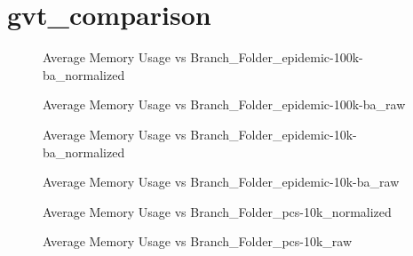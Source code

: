 \section{gvt\_comparison}
\begin{figure}[H]
\centering

\caption{Average Memory Usage vs Branch\_Folder\_epidemic-100k-ba\_normalized}
\end{figure}
\vspace{1cm}
\begin{figure}[H]
\centering

\caption{Average Memory Usage vs Branch\_Folder\_epidemic-100k-ba\_raw}
\end{figure}
\vspace{1cm}
\newpage
\begin{figure}[H]
\centering

\caption{Average Memory Usage vs Branch\_Folder\_epidemic-10k-ba\_normalized}
\end{figure}
\vspace{1cm}
\begin{figure}[H]
\centering

\caption{Average Memory Usage vs Branch\_Folder\_epidemic-10k-ba\_raw}
\end{figure}
\vspace{1cm}
\newpage
\begin{figure}[H]
\centering

\caption{Average Memory Usage vs Branch\_Folder\_pcs-10k\_normalized}
\end{figure}
\vspace{1cm}
\begin{figure}[H]
\centering

\caption{Average Memory Usage vs Branch\_Folder\_pcs-10k\_raw}
\end{figure}
